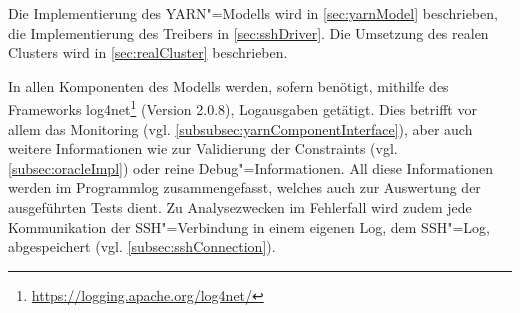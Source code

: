 Die Implementierung des \ac{YARN}"=Modells wird in \cref{sec:yarnModel} beschrieben, die Implementierung des Treibers in \cref{sec:sshDriver}.
Die Umsetzung des realen Clusters wird in \cref{sec:realCluster} beschrieben.

In allen Komponenten des Modells werden, sofern benötigt, mithilfe des Frameworks log4net\footnote{\url{https://logging.apache.org/log4net/}} (Version 2.0.8), Logausgaben getätigt.
Dies betrifft vor allem das Monitoring (vgl. \cref{subsubsec:yarnComponentInterface}), aber auch weitere Informationen wie zur Validierung der Constraints (vgl. \cref{subsec:oracleImpl}) oder reine Debug"=Informationen.
All diese Informationen werden im Programmlog zusammengefasst, welches auch zur Auswertung der ausgeführten Tests dient.
Zu Analysezwecken im Fehlerfall wird zudem jede Kommunikation der SSH"=Verbindung in einem eigenen Log, dem SSH"=Log, abgespeichert (vgl. \cref{subsec:sshConnection}).
